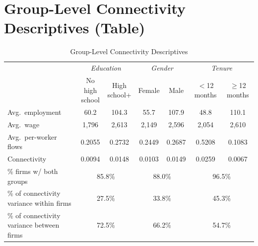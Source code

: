 \documentclass[11pt]{article}
\begin{document}
\section{Group-Level Connectivity Descriptives (Table)}
\begin{table}[H]
  \centering
  \caption{Group-Level Connectivity Descriptives}
  \footnotesize
  \begin{tabular}{lcccccc}
    \toprule\toprule
     & \multicolumn{2}{c}{\textit{Education}} & \multicolumn{2}{c}{\textit{Gender}} & \multicolumn{2}{c}{\textit{Tenure}} \\
    \cmidrule(lr){2-3} \cmidrule(lr){4-5} \cmidrule(lr){6-7}
     & \shortstack{No high\\school} & \shortstack{High\\school+} & Female & Male
     & \shortstack{$<$12\\months} & \shortstack{$\geq$12\\months} \\
    \midrule
    \quad Avg.\ employment & 60.2 & 104.3 & 55.7 & 107.9 & 48.8 & 110.1 \\
    \quad Avg.\ wage & 1,796 & 2,613 & 2,149 & 2,596 & 2,054 & 2,610 \\
    \quad Avg.\ per-worker flows & 0.2055 & 0.2732 & 0.2449 & 0.2687 & 0.5208 & 0.1083 \\
    \quad Connectivity & 0.0094 & 0.0148 & 0.0103 & 0.0149 & 0.0259 & 0.0067 \\
    \midrule
    \quad \% firms w/ both groups & \multicolumn{2}{c}{85.8\%} & \multicolumn{2}{c}{88.0\%} & \multicolumn{2}{c}{96.5\%} \\
    \quad \% of connectivity variance within firms & \multicolumn{2}{c}{27.5\%} & \multicolumn{2}{c}{33.8\%} & \multicolumn{2}{c}{45.3\%} \\
    \quad \% of connectivity variance between firms & \multicolumn{2}{c}{72.5\%} & \multicolumn{2}{c}{66.2\%} & \multicolumn{2}{c}{54.7\%} \\
    \bottomrule\bottomrule
  \end{tabular}
  \begin{minipage}{\linewidth}
    \scriptsize\vspace{4pt}

\end{minipage}
\end{table}
\end{document}
